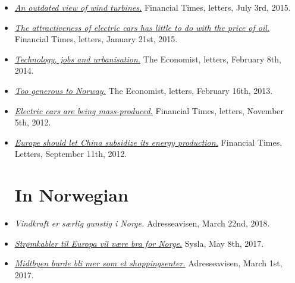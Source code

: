 \documentclass[margin]{res}
\begin{document}
\begin{resume}
\begin{itemize}
\item[] \href{http://www.ft.com/intl/cms/s/0/e22cba5c-1bfa-11e5-a130-2e7db721f996.html#axzz3giRBkRau}{\emph{An outdated view of wind turbines.}} Financial Times, letters, July 3rd, 2015.

\item[] \href{http://www.ft.com/intl/cms/s/0/313360bc-a00c-11e4-aa89-00144feab7de.html#axzz3PVKMfhY5}{\emph{The attractiveness of electric cars has little to do with the price of oil.}} Financial Times, letters, January 21st, 2015.

\item[] \href{http://www.economist.com/news/letters/21595871-livestock-and-emissions-california-technology-and-jobs-algorithms}{\emph{Technology, jobs and urbanisation.}}   The Economist, letters, February 8th, 2014.

\item[] \href{http://www.economist.com/news/letters/21571848-nordic-countries-private-schools-immigration-sandhurst-ed-koch-richard-iii}{\emph{Too generous to Norway.}} The Economist, letters, February 16th, 2013.

\item[] \href{http://www.ft.com/intl/cms/s/0/26168da6-238d-11e2-bb86-00144feabdc0.html#axzz2sclP2DP5}{\emph{Electric cars are being mass-produced.}}  Financial Times, letters, November 5th, 2012.

\item[] \href{http://www.ft.com/intl/cms/s/0/553d8cf6-fb56-11e1-87ae-00144feabdc0.html#axzz2sclP2DP5}{\emph{Europe should let China subsidize its energy production.}}  Financial Times, Letters, September 11th, 2012.


\normalsize{\section{In Norwegian}}

\item[] \emph{Vindkraft er s\ae rlig gunstig i Norge.} Adresseavisen, March 22nd, 2018.

\item[]  \href{http://sysla.no/meninger/stromkabler-til-europa-vil-vaere-bra-norge/}{\emph{Str\o mkabler til Europa vil være bra for Norge.}} Sysla, May 8th, 2017.

\item[] \href{http://www.adressa.no/meninger/ordetfritt/2017/03/01/Midtbyen-burde-bli-mer-som-et-shoppingsenter-14344490.ece?cx_Deling=AddThis}{\emph{Midtbyen burde bli mer som et shoppingsenter.}} Adresseavisen, March 1st, 2017.


\end{itemize}
\end{resume}
\end{document}
